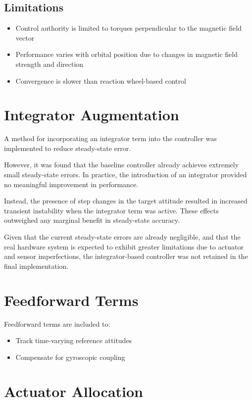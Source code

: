 \subsection{Limitations}

\begin{itemize}
	\item Control authority is limited to torques perpendicular to the magnetic field vector
	\item Performance varies with orbital position due to changes in magnetic field strength and direction
	\item Convergence is slower than reaction wheel-based control
\end{itemize}

\section{Integrator Augmentation}

A method for incorporating an integrator term into the controller was implemented to reduce steady-state error.

However, it was found that the baseline controller already achieves extremely small steady-state errors. In practice, the introduction of an integrator provided no meaningful improvement in performance.

Instead, the presence of step changes in the target attitude resulted in increased transient instability when the integrator term was active. These effects outweighed any marginal benefit in steady-state accuracy.

Given that the current steady-state errors are already negligible, and that the real hardware system is expected to exhibit greater limitations due to actuator and sensor imperfections, the integrator-based controller was not retained in the final implementation.

\section{Feedforward Terms}

Feedforward terms are included to:

\begin{itemize}
	\item Track time-varying reference attitudes
	\item Compensate for gyroscopic coupling
\end{itemize}

\section{Actuator Allocation}

